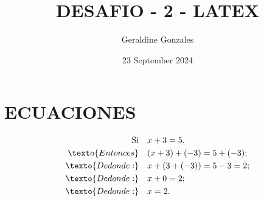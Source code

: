 \documentclass{article}
\title{DESAFIO - 2 - LATEX}
\author{Geraldine Gonzales}
\date{23 September 2024}
\begin{document}
\maketitle

\section{ECUACIONES}

\begin{align*}

\text{Si} &  \quad x+3=5, \\
\texto{Entonces} & \quad (x+3)+(-3)=5+(-3);  \\
\texto{De donde:} & \quad x+(3+(-3))=5-3=2;  \\
\texto{De donde:} & \quad x+0=2;  \\
\texto{De donde:} & \quad x=2. \\

\end{align*}
\end{document}
